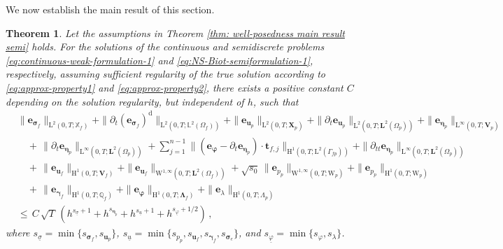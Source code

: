 \documentclass[11pt]{article}
\numberwithin{equation}{section}
\newcommand{\bgamma}{{\boldsymbol\gamma}}
\newcommand{\bLambda}{{\boldsymbol\Lambda}}
\newcommand{\bbeta}{{\boldsymbol\eta}}
\newcommand{\bsi}{{\boldsymbol\sigma}}
\newcommand{\bvarphi}{{\boldsymbol\varphi}}
\newcommand{\bu}{\mathbf{u}}
\newcommand{\bt}{{\mathbf{t}}}
\newcommand{\be}{{\mathbf{e}}}
\newcommand{\0}{{\mathbf{0}}}
\def\bX{\mathbf{X}}
\def\bV{\mathbf{V}}
\newcommand{\bL}{\mathbf{L}}
\newcommand\bbQ{\mathbb{Q}}
\newcommand\bbX{\mathbb{X}}
\newcommand\bbL{\mathbb{L}}
\def\H{\mathrm{H}}
\def\L{\mathrm{L}}
\def\W{\mathrm{W}}
\def\rd{\mathrm{d}}
\newtheorem{thm}{Theorem}[section]
\numberwithin{equation}{section}
\begin{document}
We now establish the main result of this section.
%
\begin{thm}\label{thm: error analysis}
Let the assumptions in Theorem \ref{thm: well-posedness main result semi} holds. For the solutions of the continuous and semidiscrete problems \eqref{eq:continuous-weak-formulation-1} and \eqref{eq:NS-Biot-semiformulation-1}, respectively, assuming  sufficient regularity of the true solution according to \eqref{eq:approx-property1} and \eqref{eq:approx-property2}, 
there exists a positive constant $C$ depending on the solution regularity, but independent of $h$, such that
%
\begin{align}\label{eq:errror-rate-of-convergence}
&\|\be_{\bsi_f}\|_{\L^2(0,T;\bbX_f)} 
+ \| \partial_t(\be_{\bsi_f})^{\rd}\|_{\L^2(0,T;\bbL^2(\Omega_f))} 
+ \|\be_{\bu_p}\|_{\L^2(0,T;\bX_p)} 
+ \| \partial_t\be_{\bu_p}\|_{\L^2(0,T;\bL^2(\Omega_p))}
+ \|\be_{\bbeta_p}\|_{\L^\infty(0,T;\bV_p)} \nonumber \\
&\quad +\, \|\partial_t\be_{\bbeta_p}\|_{\L^\infty(0,T;\bL^2(\Omega_p))} 
+ \sum^{n-1}_{j=1} \|( \be_{\bvarphi}-\partial_t\be_{\bbeta_p})\cdot\bt_{f,j}\|_{\H^1(0,T;\L^2(\Gamma_{fp}))}
+ \|\partial_{tt}\be_{\bbeta_p}\|_{\L^\infty(0,T;\bL^2(\Omega_p))}
\nonumber \\
&\quad +\, \|\be_{\bu_f}\|_{\H^1(0,T;\bV_f)}
+ \|\be_{\bu_f}\|_{\W^{1,\infty}(0,T;\bL^2(\Omega_f))}
+ \sqrt{s_0}\,\|\be_{p_p}\|_{\W^{1,\infty}(0,T;\W_p)} 
+ \|\be_{p_p}\|_{\H^1(0,T;\W_p)} 
\nonumber \\[0.5ex]
&\quad +\, \|\be_{\bgamma_f}\|_{\H^1(0,T;\bbQ_f)} 
+ \|\be_{\bvarphi}\|_{\H^1(0,T;\bLambda_f)} 
+ \|\be_{\lambda}\|_{\H^1(0,T;\Lambda_p)}
\nonumber \\[0.5ex]
&\leq\, C\,\sqrt{T}\,\left( h^{s_{\underline{\sigma}}+1} + h^{s_{\bbeta_p}} 
+ h^{s_{\underline{u}}+1} +  h^{s_{\underline{\varphi}}+  1/2} \right) \,,
\end{align}
%
where $s_{\underline{\sigma}}= \min\{ s_{\bsi_f}, s_{\bu_p}\}$, $s_{\underline{u}}= \min\{ s_{p_p}, s_{\bu_f}, s_{\bgamma_f}, s_{\bsi_e} \}$, and  $s_{\underline{\varphi}}= \min\{ s_{\varphi}, s_{\lambda}\}$.
\end{thm}
%
\end{document}
